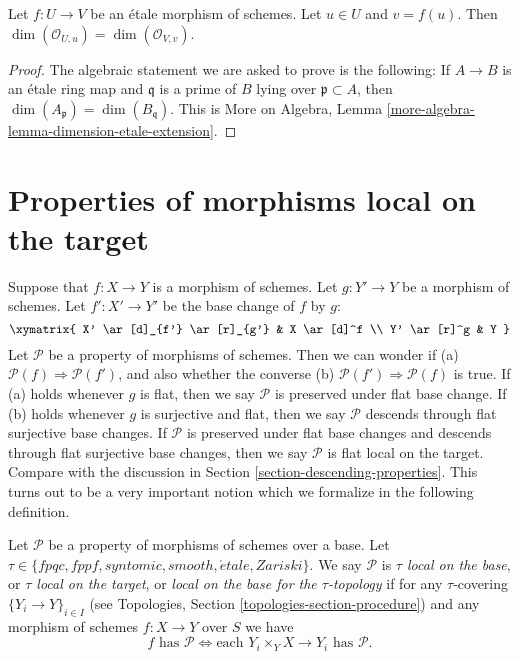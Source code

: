 \begin{lemma}
\label{lemma-dimension-local-ring-local}
Let $f : U \to V$ be an \'etale morphism of schemes.
Let $u \in U$ and $v = f(u)$. Then
$\dim(\mathcal{O}_{U, u}) = \dim(\mathcal{O}_{V, v})$.
\end{lemma}

\begin{proof}
The algebraic statement we are asked to prove is the following:
If $A \to B$ is an \'etale ring map and $\mathfrak q$ is a prime of
$B$ lying over $\mathfrak p \subset A$, then
$\dim(A_{\mathfrak p}) = \dim(B_{\mathfrak q})$.
This is
More on Algebra, Lemma \ref{more-algebra-lemma-dimension-etale-extension}.
\end{proof}








\section{Properties of morphisms local on the target}
\label{section-descending-properties-morphisms}

\noindent
Suppose that $f : X \to Y$ is a morphism of schemes.
Let $g : Y' \to Y$ be a morphism of schemes.
Let $f' : X' \to Y'$ be the base change of $f$ by $g$:
$$
\xymatrix{
X' \ar[d]_{f'} \ar[r]_{g'} & X \ar[d]^f \\
Y' \ar[r]^g & Y
}
$$
Let $\mathcal{P}$ be a property of morphisms of schemes.
Then we can wonder if (a) $\mathcal{P}(f) \Rightarrow \mathcal{P}(f')$,
and also whether the converse (b) $\mathcal{P}(f') \Rightarrow \mathcal{P}(f)$
is true. If (a) holds whenever $g$ is flat, then we say $\mathcal{P}$
is preserved under flat base change. If (b) holds whenever $g$ is
surjective and flat, then we say $\mathcal{P}$ descends through
flat surjective base changes. If $\mathcal{P}$ is preserved under
flat base changes and descends through flat surjective base changes,
then we say $\mathcal{P}$ is flat local on the target.
Compare with the discussion in
Section \ref{section-descending-properties}.
This turns out to be a very important notion which
we formalize in the following definition.

\begin{definition}
\label{definition-property-morphisms-local}
Let $\mathcal{P}$ be a property of morphisms of schemes over a base.
Let $\tau \in \{fpqc, fppf, syntomic, smooth, \acute{e}tale, Zariski\}$.
We say $\mathcal{P}$ is {\it $\tau$ local on the base}, or
{\it $\tau$ local on the target}, or
{\it local on the base for the $\tau$-topology} if for any
$\tau$-covering $\{Y_i \to Y\}_{i \in I}$ (see
Topologies, Section \ref{topologies-section-procedure})
and any morphism of schemes $f : X \to Y$ over $S$ we
have
$$
f \text{ has }\mathcal{P}
\Leftrightarrow
\text{each }Y_i \times_Y X \to Y_i\text{ has }\mathcal{P}.
$$
\end{definition}

